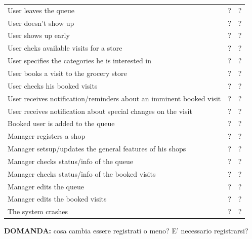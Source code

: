 \begin{tabular}{|l|c|c|}
    User leaves the queue & ? & ? \\
    User doesn't show up & ? & ? \\
    User shows up early & ? & ? \\
    \hline
    User cheks available visits for a store & ? & ? \\
    User specifies the categories he is interested in & ? & ? \\
    User books a visit to the grocery store & ? & ? \\
    User checks his booked visits & ? & ? \\
    User receives notification/reminders about an imminent booked visit & ? & ? \\
    User receives notification about special changes on the visit & ? & ? \\
    Booked user is added to the queue & ? & ? \\ %
    \hline
    Manager registers a shop & ? & ? \\
    Manager setsup/updates the general features of his shops & ? & ? \\
    Manager checks status/info of the queue & ? & ? \\
    Manager checks status/info of the booked visits & ? & ? \\
    Manager edits the queue & ? & ? \\
    Manager edits the booked visits & ? & ? \\
    \hline
    The system crashes & ? & ? \\
    \hline
\end{tabular}

\textbf{DOMANDA:} cosa cambia essere registrati o meno? E' necessario registrarsi?